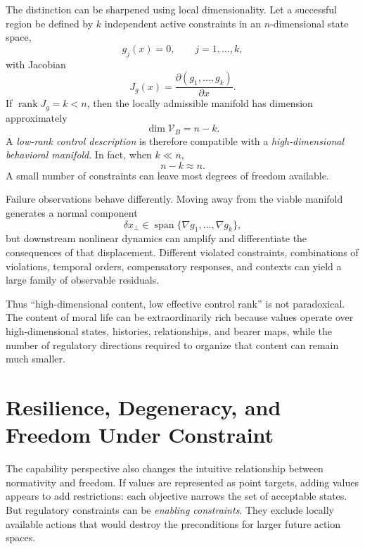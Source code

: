 \documentclass[11pt]{article}
\newcommand{\V}{\mathcal{V}}
\begin{document}
The distinction can be sharpened using local dimensionality. Let a successful region be defined by $k$ independent active constraints in an $n$-dimensional state space,
\begin{equation}
    g_j(x)=0,
    \qquad j=1,\ldots,k,
\end{equation}
with Jacobian
\[
    J_g(x)
    =
    \frac{\partial(g_1,\ldots,g_k)}
         {\partial x}.
\]
If $\operatorname{rank}J_g=k<n$, then the locally admissible manifold has dimension approximately
\begin{equation}
    \dim\V_B=n-k.
\end{equation}
A \emph{low-rank control description} is therefore compatible with a \emph{high-dimensional behavioral manifold}. In fact, when $k\ll n$,
\[
    n-k\approx n.
\]
A small number of constraints can leave most degrees of freedom available.

Failure observations behave differently. Moving away from the viable manifold generates a normal component
\begin{equation}
    \delta x_\perp
    \in
    \operatorname{span}\{\nabla g_1,\ldots,\nabla g_k\},
\end{equation}
but downstream nonlinear dynamics can amplify and differentiate the consequences of that displacement. Different violated constraints, combinations of violations, temporal orders, compensatory responses, and contexts can yield a large family of observable residuals.

Thus ``high-dimensional content, low effective control rank'' is not paradoxical. The content of moral life can be extraordinarily rich because values operate over high-dimensional states, histories, relationships, and bearer maps, while the number of regulatory directions required to organize that content can remain much smaller.

\section{Resilience, Degeneracy, and Freedom Under Constraint}

The capability perspective also changes the intuitive relationship between normativity and freedom. If values are represented as point targets, adding values appears to add restrictions: each objective narrows the set of acceptable states. But regulatory constraints can be \emph{enabling constraints}. They exclude locally available actions that would destroy the preconditions for larger future action spaces.
\end{document}
